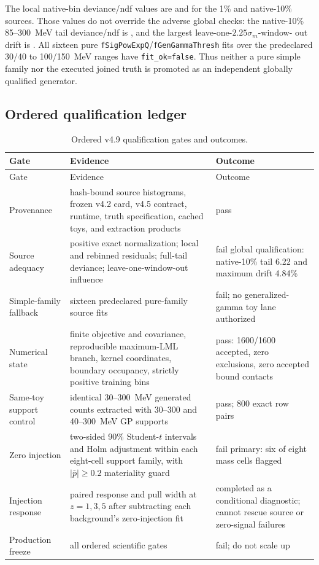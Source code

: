 The local native-bin deviance/ndf values are
\VFourPNineLocalDevianceOnePct{} and \VFourPNineLocalDevianceNativeTen{} for the 1\%
and native-10\% sources.  Those values do not override the adverse global checks: the
native-10\% 85--300~MeV tail deviance/ndf is
\VFourPNineTailDevianceNativeTen{}, and the largest leave-one-$2.25\sigma_m$-window-
out drift is \VFourPNineMaximumLOODrift.  All sixteen pure
\texttt{fSigPowExpQ}/\texttt{fGenGammaThresh} fits over the predeclared 30/40 to
100/150~MeV ranges have \texttt{fit\_ok=false}.  Thus neither a pure simple family nor
the executed joined truth is promoted as an independent globally qualified generator.

\subsection{Ordered qualification ledger}

\begin{longtable}{P{0.18\textwidth}P{0.32\textwidth}P{0.38\textwidth}}
\caption{Ordered v4.9 qualification gates and outcomes.}
\label{tab:v4p9-full-gates}\\
\toprule
Gate & Evidence & Outcome \\
\midrule
\endfirsthead
\toprule
Gate & Evidence & Outcome \\
\midrule
\endhead
\bottomrule
\endfoot
Provenance & hash-bound source histograms, frozen v4.2 card, v4.5 contract, runtime,
truth specification, cached toys, and extraction products & pass \\
Source adequacy & positive exact normalization; local and rebinned residuals;
full-tail deviance; leave-one-window-out influence & fail global qualification:
native-10\% tail 6.22 and maximum drift 4.84\% \\
Simple-family fallback & sixteen predeclared pure-family source fits & fail; no
generalized-gamma toy lane authorized \\
Numerical state & finite objective and covariance, reproducible maximum-LML branch,
kernel coordinates, boundary occupancy, strictly positive training bins & pass:
1600/1600 accepted, zero exclusions, zero accepted bound contacts \\
Same-toy support control & identical 30--300~MeV generated counts extracted with
30--300 and 40--300~MeV GP supports & pass; 800 exact row pairs \\
Zero injection & two-sided 90\% Student-$t$ intervals and Holm adjustment within each
eight-cell support family, with $|\bar p|\geq0.2$ materiality guard & fail primary:
six of eight mass cells flagged \\
Injection response & paired response and pull width at $z=1,3,5$ after subtracting
each background's zero-injection fit & completed as a conditional diagnostic; cannot
rescue source or zero-signal failures \\
Production freeze & all ordered scientific gates & fail; do not scale up \\
\end{longtable}

